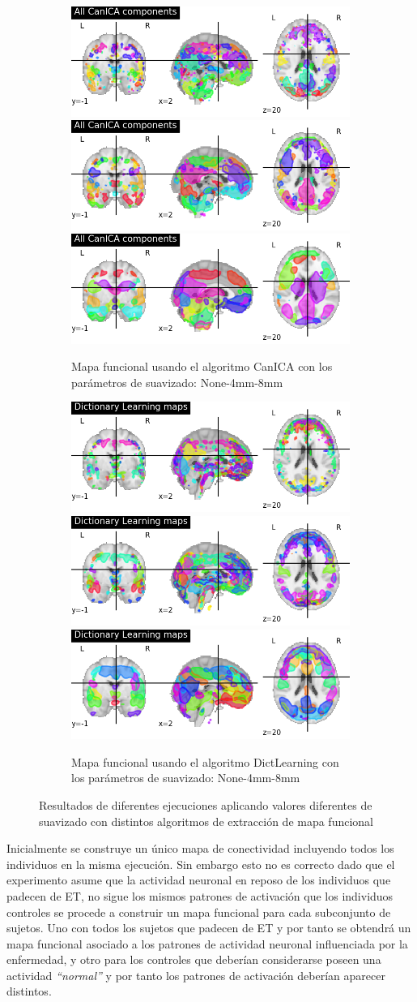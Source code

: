 \begin{figure}[H]
  \begin{subfigure}{\linewidth}
  \includegraphics[width=.3\linewidth]{img/canica/canica_None.png}\hfill
  \includegraphics[width=.3\linewidth]{img/canica/canica_4.png}\hfill
  \includegraphics[width=.3\linewidth]{img/canica/canica_8.png}
  \caption{Mapa funcional usando el algoritmo  CanICA con los parámetros de suavizado: None-4mm-8mm}
  \end{subfigure}\par\medskip
  \begin{subfigure}{\linewidth}
  \includegraphics[width=.3\linewidth]{img/canica/dictlearn_None}\hfill
  \includegraphics[width=.3\linewidth]{img/canica/dictlearn_4}\hfill
  \includegraphics[width=.3\linewidth]{img/canica/dictlearn_8}
  \caption{Mapa funcional usando el algoritmo  DictLearning con los parámetros de suavizado: None-4mm-8mm}
  \end{subfigure}\par\medskip
  \caption{Resultados de diferentes ejecuciones aplicando valores diferentes de suavizado con distintos algoritmos de extracción de mapa funcional}
  \label{preproc:mapa}
\end{figure}

Inicialmente se construye un único mapa de conectividad incluyendo todos los individuos en la misma ejecución. Sin embargo esto no es correcto dado que el experimento asume que la actividad neuronal en reposo de los individuos que padecen de ET, no sigue los mismos patrones de activación que los individuos controles se procede a construir un mapa funcional para cada subconjunto de sujetos. Uno con todos los sujetos que padecen de ET y por tanto se obtendrá un mapa funcional asociado a los patrones de actividad neuronal influenciada por la enfermedad, y otro para los controles que deberían considerarse poseen una actividad \textit{``normal''} y por tanto los patrones de activación deberían aparecer distintos.
 
